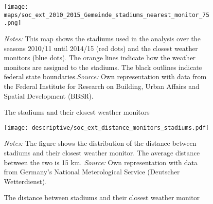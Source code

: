 \documentclass[11pt, a4paper]{article} %
\begin{document}
\vspace*{\fill}
\begin{figure}[H]\centering
	\caption{The stadiums and their closest weather monitors}\label{fig_soc_ext:map_gem_stadiums_nearest_monitor}
	\texttt{[image: maps/soc\_ext\_2010\_2015\_Gemeinde\_stadiums\_nearest\_monitor\_75.png]}
	\begin{minipage}{0.95\linewidth}
		\scriptsize{\emph{Notes:} This map shows the stadiums used in the analysis over the seasons 2010/11 until 2014/15 (red dots) and the closest weather monitors (blue dots). The orange lines indicate how the weather monitors are assigned to the stadiums. The black outlines indicate federal state boundaries.\newline \emph{Source:} Own representation with data from the Federal Institute for Research on Building, Urban Affairs and Spatial Development (BBSR).}
	\end{minipage}
\end{figure}
\vspace*{\fill}\clearpage




\vspace*{\fill}
\begin{figure}[H]\centering
	\caption{The distance between stadiums and their closest weather monitor}\label{fig_soc_ext:hist_distance_stadium_monitors}
	\texttt{[image: descriptive/soc\_ext\_distance\_monitors\_stadiums.pdf]}
	\begin{minipage}{0.95\linewidth}
		\scriptsize{\emph{Notes:} The figure shows the distribution of the distance between stadiums and their closest weather monitor. The average distance between the two is 15 km. \newline \emph{Source:} Own representation with data from Germany's National Meterological Service (Deutscher Wetterdienst).}
	\end{minipage}
\end{figure}
\vspace*{\fill}\clearpage



\end{document}
